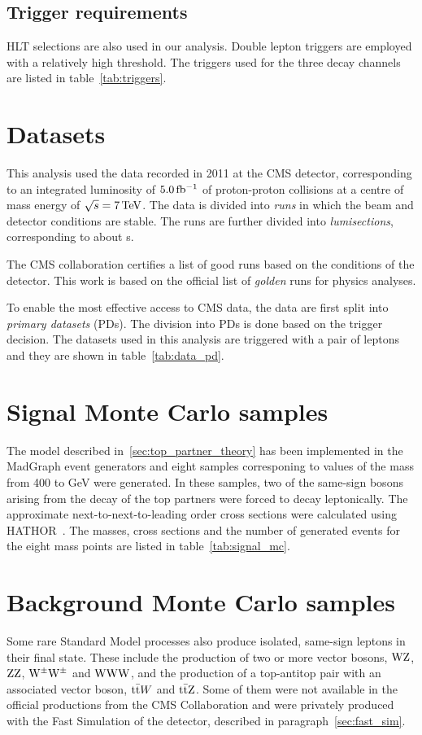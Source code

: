 \subsection{Trigger requirements}\label{sec:triggers}
HLT selections are also used in our analysis. Double lepton triggers are
employed with a relatively high \pt threshold. The triggers used for the
three decay channels are listed in table~\ref{tab:triggers}.


\section{Datasets}
This analysis used the data recorded in 2011 at the CMS detector,
corresponding to an integrated luminosity of $\unit[5.0]{fb^{-1}}$ of
proton-proton collisions at a centre of mass energy of
$\sqrt{s}=\unit[7]{TeV}$.
The data is divided into \emph{runs} in which the beam and detector
conditions are stable. The runs are further divided into
\emph{lumisections}, corresponding to about \unit[23]{s}.

The CMS collaboration certifies a list of good runs based on the conditions
of the detector. This work is based on the official list of \emph{golden}
runs for physics analyses.

To enable the most effective access to CMS data, the data are first split
into \emph{primary datasets} (PDs). The division into PDs is done based on the trigger decision.
The datasets used in this analysis are triggered with a pair of leptons and
they are shown in table~\ref{tab:data_pd}.



\section{Signal Monte Carlo samples}
The model described in~\ref{sec:top_partner_theory} has been implemented in
the MadGraph event generators and eight samples corresponing to values of
the \TP mass from 400 to \unit[750]{GeV} were generated. In these samples,
two of the same-sign \W bosons arising from the decay of the top partners
were forced to decay leptonically. The approximate next-to-next-to-leading
order cross sections were calculated using HATHOR~\cite{hathor}. The masses,
cross sections and the number of generated events for the eight mass points
are listed in table~\ref{tab:signal_mc}. 



\section{Background Monte Carlo samples}
Some rare Standard Model processes also produce isolated, same-sign leptons
in their final state. These include the production of two or more vector
bosons, $\mathrm{W}\mathrm{Z}$, $\mathrm{Z}\mathrm{Z}$, $\mathrm{W}^\pm\mathrm{W}^\pm$ and $\mathrm{W}\mathrm{W}\mathrm{W}$, and the production of
a top-antitop pair with an associated vector boson, $\mathrm{t}\bar{\mathrm{t}} W$ and
$\mathrm{t}\bar{\mathrm{t}} \mathrm{Z}$. Some of them were not available in the official productions
from the CMS Collaboration and were privately produced with the Fast
Simulation of the detector, described in paragraph~\ref{sec:fast_sim}.

